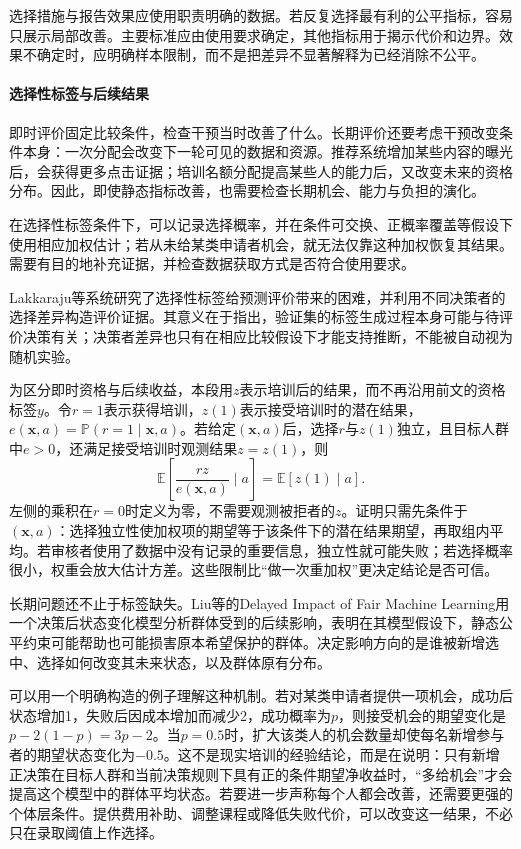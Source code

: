 选择措施与报告效果应使用职责明确的数据。若反复选择最有利的公平指标，容易只展示局部改善。主要标准应由使用要求确定，其他指标用于揭示代价和边界。效果不确定时，应明确样本限制，而不是把差异不显著解释为已经消除不公平。

\paragraph{选择性标签与后续结果}

即时评价固定比较条件，检查干预当时改善了什么。长期评价还要考虑干预改变条件本身：一次分配会改变下一轮可见的数据和资源。推荐系统增加某些内容的曝光后，会获得更多点击证据；培训名额分配提高某些人的能力后，又改变未来的资格分布。因此，即使静态指标改善，也需要检查长期机会、能力与负担的演化。

在选择性标签条件下，可以记录选择概率，并在条件可交换、正概率覆盖等假设下使用相应加权估计；若从未给某类申请者机会，就无法仅靠这种加权恢复其结果。需要有目的地补充证据，并检查数据获取方式是否符合使用要求。

Lakkaraju等系统研究了选择性标签给预测评价带来的困难，并利用不同决策者的选择差异构造评价证据。其意义在于指出，验证集的标签生成过程本身可能与待评价决策有关；决策者差异也只有在相应比较假设下才能支持推断，不能被自动视为随机实验。

为区分即时资格与后续收益，本段用$z$表示培训后的结果，而不再沿用前文的资格标签$y$。令$r=1$表示获得培训，$z(1)$表示接受培训时的潜在结果，$e(\bm{x},a)=\mathbb P(r=1\mid\bm{x},a)$。若给定$(\bm{x},a)$后，选择$r$与$z(1)$独立，且目标人群中$e>0$，还满足接受培训时观测结果$z=z(1)$，则
\begin{equation}
 \mathbb E\!\left[\frac{r z}{e(\bm{x},a)}\mid a\right]
 =\mathbb E[z(1)\mid a].
 \label{eq:fairness-selective-weight}
\end{equation}
左侧的乘积在$r=0$时定义为零，不需要观测被拒者的$z$。证明只需先条件于$(\bm{x},a)$：选择独立性使加权项的期望等于该条件下的潜在结果期望，再取组内平均。若审核者使用了数据中没有记录的重要信息，独立性就可能失败；若选择概率很小，权重会放大估计方差。这些限制比“做一次重加权”更决定结论是否可信。

长期问题还不止于标签缺失。Liu等的Delayed Impact of Fair Machine Learning用一个决策后状态变化模型分析群体受到的后续影响，表明在其模型假设下，静态公平约束可能帮助也可能损害原本希望保护的群体。决定影响方向的是谁被新增选中、选择如何改变其未来状态，以及群体原有分布。

可以用一个明确构造的例子理解这种机制。若对某类申请者提供一项机会，成功后状态增加1，失败后因成本增加而减少2，成功概率为$p$，则接受机会的期望变化是$p-2(1-p)=3p-2$。当$p=0.5$时，扩大该类人的机会数量却使每名新增参与者的期望状态变化为$-0.5$。这不是现实培训的经验结论，而是在说明：只有新增正决策在目标人群和当前决策规则下具有正的条件期望净收益时，“多给机会”才会提高这个模型中的群体平均状态。若要进一步声称每个人都会改善，还需要更强的个体层条件。提供费用补助、调整课程或降低失败代价，可以改变这一结果，不必只在录取阈值上作选择。


